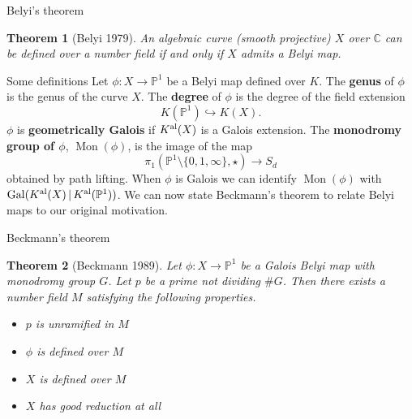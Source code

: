 \documentclass[xcolor=dvipsnames]{beamer}
\theoremstyle{plain}
\newtheorem*{thm}{Theorem}
\newcommand{\PP}{\mathbb P}
\newcommand{\CC}{\mathbb C}
\newcommand{\Kal}{{{K}^{\textup{al}}}}
\DeclareMathOperator{\Mon}{Mon}
\DeclareMathOperator{\Gal}{Gal}
\begin{document}
{\begin{frame}{Belyi's theorem}
      \begin{thm}[Belyi 1979]
        \vspace{1pt}
        An algebraic curve (smooth projective)
        $X$ over $\CC$ can be defined over a number
        field if and only if $X$ admits a
        Belyi map.
      \end{thm}
    \end{frame}
    \begin{frame}{Some definitions}
      Let $\phi\colon X\to\PP^1$ be a Belyi map
      defined over $K$.
      \pause\newline
      The \textbf{genus} of $\phi$ is the genus
      of the curve $X$.
      \pause\newline
      The \textbf{degree} of $\phi$
      is the degree of the field extension
      \[
        K(\PP^1)\hookrightarrow K(X).
      \]
      \pause
      $\phi$ is \textbf{geometrically Galois}
      if $\Kal(X)$ is a Galois extension.
      \pause\newline
      The \textbf{monodromy group of $\phi$},
      $\Mon(\phi)$,
      is the image of the map
      \[
        \pi_1(\PP^1\setminus\{0,1,\infty\},\star)
        \to S_d
      \]
      obtained by path lifting.
      \pause\newline
      When $\phi$ is Galois we
      can identify $\Mon(\phi)$ with
      $\Gal(\Kal(X)\,|\,\Kal(\PP^1))$.
      \pause\newline
      We can now state Beckmann's theorem
      to relate Belyi maps to our original
      motivation.
    \end{frame}
    \begin{frame}{Beckmann's theorem}
      \begin{thm}[Beckmann 1989]
        \vspace{1pt}
        Let $\phi\colon X\to\PP^1$ be a Galois
        Belyi map with monodromy group $G$.
        Let $p$ be a prime not dividing
        $\#G$.
        \pause\newline
        Then there exists a number field $M$
        satisfying the following properties.
        \pause
        \begin{itemize}
          \item
            $p$ is unramified in $M$
          \item
            $\phi$ is defined over $M$
          \item
            $X$ is defined over $M$
          \item
            $X$ has good reduction at all

\end{itemize}
\end{thm}
\end{frame}}
\end{document}

